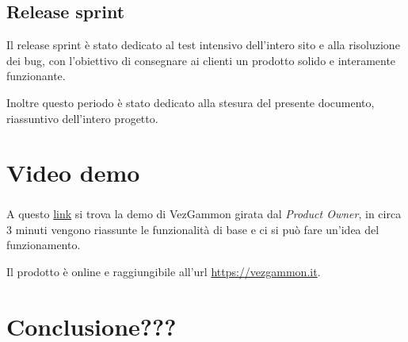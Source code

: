 \documentclass{article}
\begin{document}
\subsection{Release sprint}
Il release sprint è stato dedicato al test intensivo dell'intero sito e alla risoluzione dei bug, con l'obiettivo di consegnare ai clienti un 
prodotto solido e interamente funzionante.

Inoltre questo periodo è stato dedicato alla stesura del presente documento, riassuntivo dell'intero progetto.

\section{Video demo}
A questo \href{https://www.youtube.com/watch?v=dQw4w9WgXcQ}{link} si trova la demo di VezGammon\textsuperscript{\texttrademark} girata dal \textit{Product Owner}, 
in circa 3 minuti vengono riassunte le funzionalità di base e ci si può fare un'idea del funzionamento.

Il prodotto è online e raggiungibile all'url \url{https://vezgammon.it}.

\section{Conclusione???}
\end{document}
